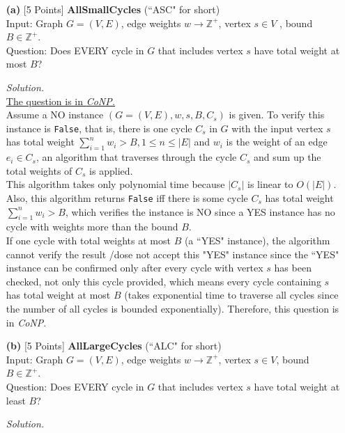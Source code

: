 \documentclass[10pt]{article}
\begin{document}
\begin{itemize}
    \item [\textbf{(a)}] {[5 Points]} \textbf{AllSmallCycles} (``ASC" for short)\\
    Input: Graph $G = (V, E)$, edge weights $w \rightarrow \mathbb{Z}^+$, vertex $s \in V$ , bound $B \in \mathbb{Z}^+$.\\
    Question: Does EVERY cycle in $G$ that includes vertex $s$ have total weight at most $B$?
    \begin{mdframed}
        \textit{Solution.}\\
        \underline{The question is in \textit{CoNP.}}\\
        Assume a NO instance $(G=(V,E), w, s, B, C_s)$ is given. To verify this instance is \texttt{False}, that is, there is one cycle $C_s$ in $G$ with the input vertex $s$ has total weight $\sum_{i=1}^{n} w_i > B, 1 \leq n \leq |E|$ and $w_i$ is the weight of an edge $e_i \in C_s$, an algorithm that traverses through the cycle $C_s$ and sum up the total weights of $C_s$ is applied.\\
        This algorithm takes only polynomial time because $|C_s|$ is linear to $O(|E|)$. Also, this algorithm returns \texttt{False} iff there is some cycle $C_s$ has total weight $\sum_{i=1}^{n} w_i > B$, which verifies the instance is NO since a YES instance has no cycle with weights more than the bound $B$.\\
        If one cycle with total weights at most $B$ (a ``YES" instance), the algorithm cannot verify the result /dose not accept this "YES" instance since the ``YES" instance can be confirmed only after every cycle with vertex $s$ has been checked, not only this cycle provided, which means every cycle containing $s$ has total weight at most $B$ (takes exponential time to traverse all cycles since the number of all cycles is bounded exponentially). Therefore, this question is in \textit{CoNP}. 
    \end{mdframed}
    \item [\textbf{(b)}] {[5 Points]} \textbf{AllLargeCycles} (``ALC" for short)\\
    Input: Graph $G = (V, E)$, edge weights $w \rightarrow \mathbb{Z}^+$, vertex $s \in V$, bound $B \in \mathbb{Z}^+$.\\
    Question: Does EVERY cycle in $G$ that includes vertex $s$ have total weight at least $B$?
    \begin{mdframed}
        \textit{Solution.}\\

\end{mdframed}
\end{itemize}
\end{document}
